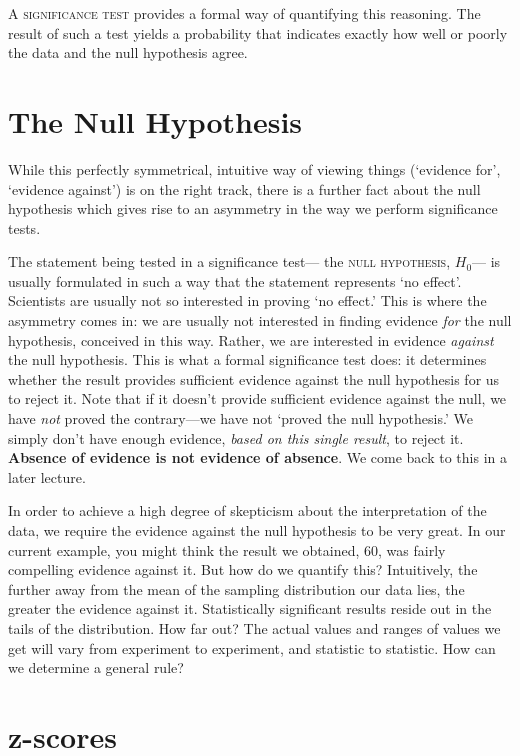 \documentclass[12pt]{book}\usepackage[]{graphicx}\usepackage[]{color}
\begin{document}
A \textsc{significance test} provides a formal way of quantifying this reasoning. 
The result of such a test yields a probability that
indicates exactly how well or poorly the data and the null hypothesis agree.


\section{The Null Hypothesis}

While this perfectly symmetrical, intuitive way of viewing things (`evidence for', `evidence against') is on the right track, there is a further fact about the null hypothesis which gives rise to an asymmetry in the way we perform significance tests.

The statement being tested in a significance test--- the
\textsc{null hypothesis}, $H_0$--- is usually formulated in such a way
that the statement represents `no effect'. 
Scientists are usually not so interested in proving `no effect.' This is where the asymmetry comes in: we are usually not interested in finding evidence \emph{for} the null hypothesis, conceived in this way. Rather, we are interested in evidence \emph{against} the null hypothesis. This is what a formal significance test does: it determines whether the result provides sufficient evidence against the null hypothesis for us to reject it.
Note that if it doesn't provide sufficient evidence against the null, we have \emph{not} proved the contrary---we have not `proved the null hypothesis.' We simply don't have enough evidence, \emph{based on this single result}, to reject it. 
\textbf{Absence of evidence is not evidence of absence}.
We come back to this in a later lecture.

In order to achieve a high degree of skepticism about the interpretation of the data, we require the evidence against the null hypothesis to be very great. 
In our current example, you might think the result we obtained, 60, was fairly compelling evidence against it. But how do we quantify this? Intuitively, the further away from the mean of the sampling distribution our data lies, the greater the evidence against it. Statistically significant results reside out in the tails of the distribution. How far out? The actual values and ranges of values we get will vary from experiment to experiment, and statistic to statistic. How can we determine a general rule?

\section{z-scores} \label{zscores}
\end{document}
